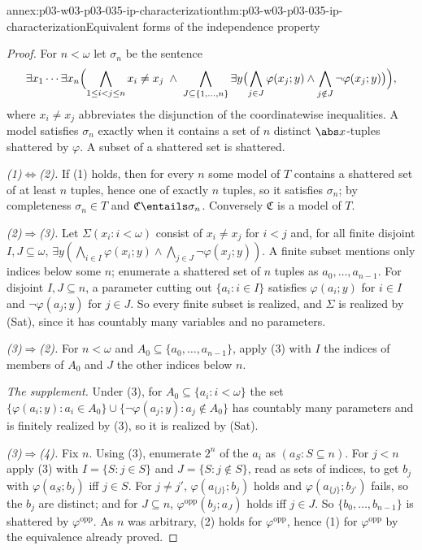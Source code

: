\begin{annexitem}{annex:p03-w03-p03-035-ip-characterization}{thm:p03-w03-p03-035-ip-characterization}{Equivalent forms of the independence property}
\begin{proof}
For \(n<\omega\) let \(\sigma_n\) be the sentence
\[
  \exists x_1\cdots\exists x_n\Bigl(\bigwedge_{1\leq i<j\leq n}x_i\neq x_j
  \;\wedge\;\bigwedge_{J\subseteq\{1,\ldots,n\}}\exists y
  \bigl(\bigwedge_{j\in J}\varphi(x_j;y)\wedge
  \bigwedge_{j\notin J}\neg\varphi(x_j;y)\bigr)\Bigr),
\]
where \(x_i\neq x_j\) abbreviates the disjunction of the coordinatewise
inequalities.  A model satisfies \(\sigma_n\) exactly when it contains a set
of \(n\) distinct \(\abs x\)-tuples shattered by \(\varphi\).  A subset of a
shattered set is shattered.

\emph{(1)\(\Leftrightarrow\)(2).}  If (1) holds, then for every \(n\) some
model of \(T\) contains a shattered set of at least \(n\) tuples, hence one of
exactly \(n\) tuples, so it satisfies \(\sigma_n\); by completeness
\(\sigma_n\in T\) and \(\mathfrak C\entails\sigma_n\).  Conversely
\(\mathfrak C\) is a model of \(T\).

\emph{(2)\(\Rightarrow\)(3).}  Let \(\Sigma(x_i:i<\omega)\) consist of
\(x_i\neq x_j\) for \(i<j\) and, for all finite disjoint \(I,J\subseteq\omega\),
\(\exists y(\bigwedge_{i\in I}\varphi(x_i;y)\wedge\bigwedge_{j\in J}\neg\varphi(x_j;y))\).
A finite subset mentions only indices below some \(n\); enumerate a
shattered set of \(n\) tuples as \(a_0,\ldots,a_{n-1}\).  For disjoint
\(I,J\subseteq n\), a parameter cutting out \(\{a_i:i\in I\}\) satisfies
\(\varphi(a_i;y)\) for \(i\in I\) and \(\neg\varphi(a_j;y)\) for \(j\in J\).
So every finite subset is realized, and \(\Sigma\) is realized by (Sat),
since it has countably many variables and no parameters.

\emph{(3)\(\Rightarrow\)(2).}  For \(n<\omega\) and \(A_0\subseteq
\{a_0,\ldots,a_{n-1}\}\), apply (3) with \(I\) the indices of members of
\(A_0\) and \(J\) the other indices below \(n\).

\emph{The supplement.}  Under (3), for \(A_0\subseteq\{a_i:i<\omega\}\) the
set \(\{\varphi(a_i;y):a_i\in A_0\}\cup\{\neg\varphi(a_j;y):a_j\notin A_0\}\)
has countably many parameters and is finitely realized by (3), so it is
realized by (Sat).

\emph{(3)\(\Rightarrow\)(4).}  Fix \(n\).  Using (3), enumerate \(2^n\) of
the \(a_i\) as \((a_S:S\subseteq n)\).  For \(j<n\) apply (3) with
\(I=\{S:j\in S\}\) and \(J=\{S:j\notin S\}\), read as sets of indices, to get
\(b_j\) with \(\varphi(a_S;b_j)\) iff \(j\in S\).  For \(j\neq j'\),
\(\varphi(a_{\{j\}};b_j)\) holds and \(\varphi(a_{\{j\}};b_{j'})\) fails, so
the \(b_j\) are distinct; and for \(J\subseteq n\),
\(\varphi^{\mathrm{opp}}(b_j;a_J)\) holds iff \(j\in J\).  So
\(\{b_0,\ldots,b_{n-1}\}\) is shattered by \(\varphi^{\mathrm{opp}}\).  As
\(n\) was arbitrary, (2) holds for \(\varphi^{\mathrm{opp}}\), hence (1) for
\(\varphi^{\mathrm{opp}}\) by the equivalence already proved.


\end{proof}
\end{annexitem}

